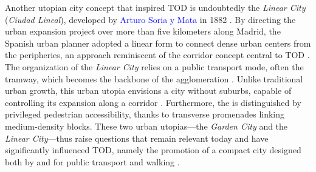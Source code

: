 \begin{refsegment}
Another utopian city concept that inspired \acrshort{TOD} is undoubtedly the \textsl{Linear City} (\textsl{Ciudad Lineal}), developed by \textcolor{blue}{Arturo Soria y Mata} in 1882 \textcolor{blue}{\autocite{lemelson_center_george_2014}}. By directing the urban expansion project over more than five kilometers along Madrid, the Spanish urban planner adopted a linear form to connect dense urban centers from the peripheries, an approach reminiscent of the corridor concept central to \acrshort{TOD} \textcolor{blue}{\autocite[348]{lopez_rodriguez_arturo_2017}}. The organization of the \textsl{Linear City} relies on a public transport mode, often the tramway, which becomes the backbone of the agglomeration \textcolor{blue}{\autocite{lemelson_center_george_2014}}. Unlike traditional urban growth, this urban utopia envisions a city without suburbs, capable of controlling its expansion along a corridor \textcolor{blue}{\autocite[722]{furundzic_infrastructure_2012}}. Furthermore, the  is distinguished by privileged pedestrian accessibility, thanks to transverse promenades linking medium-density blocks. These two urban utopias—the \textsl{Garden City} and the \textsl{Linear City}—thus raise questions that remain relevant today and have significantly influenced \acrshort{TOD}, namely the promotion of a compact city designed both by and for public transport and walking \textcolor{blue}{\autocite[11]{salomon_cavin_cites-jardins_2007}}.%


\end{refsegment}
